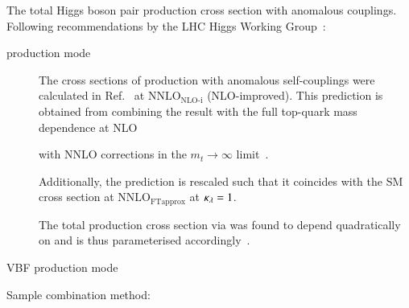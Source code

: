 The total Higgs boson pair production cross section with anomalous
couplings. Following recommendations by the LHC Higgs Working
Group~\cite{LHCHWGHH}:
\begin{description}

\item[\ggF production mode] The cross sections of \HH production with
  anomalous self-couplings were calculated in
  Ref.~\cite{Amoroso:2020lgh} at $\text{NNLO}_{\text{NLO-i}}$
  (NLO-improved). This prediction is obtained from combining the
  result with the full top-quark mass dependence at
  NLO~\cite{Buchalla:2018yce}


  with NNLO corrections in the $m_{t} \to \infty$
  limit~\cite{deFlorian:2017qfk}.

  Additionally, the prediction is rescaled such that it coincides with
  the SM \HH cross section at $\text{NNLO}_{\text{FTapprox}}$ at
  $\kappa_{\lambda} = 1$.

  The total \HH production cross section via \ggF was found to depend
  quadratically on \klambda and is thus parameterised
  accordingly~\cite{LHCHWGHH}.

\item[VBF production mode]

\end{description}



Sample combination method:~\cite{ATL-PHYS-PUB-2019-007}




